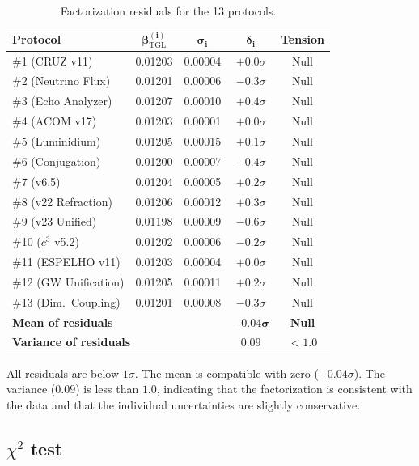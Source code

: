 \documentclass[12pt,a4paper,twoside]{article}
\newcommand{\betatgl}{\beta_{\!\scriptscriptstyle\mathrm{TGL}}}
\begin{document}
\begin{table}[H]
\centering
\caption{Factorization residuals for the 13 protocols.}
\label{tab:residuos}
\begin{tabular}{lcccc}
\toprule
\textbf{Protocol} & $\boldsymbol{\betatgl^{(i)}}$ & $\boldsymbol{\sigma_i}$ & $\boldsymbol{\delta_i}$ & \textbf{Tension} \\
\midrule
\#1 (CRUZ v11) & 0.01203 & 0.00004 & $+0.0\sigma$ & Null \\
\#2 (Neutrino Flux) & 0.01201 & 0.00006 & $-0.3\sigma$ & Null \\
\#3 (Echo Analyzer) & 0.01207 & 0.00010 & $+0.4\sigma$ & Null \\
\#4 (ACOM v17) & 0.01203 & 0.00001 & $+0.0\sigma$ & Null \\
\#5 (Luminidium) & 0.01205 & 0.00015 & $+0.1\sigma$ & Null \\
\#6 (Conjugation) & 0.01200 & 0.00007 & $-0.4\sigma$ & Null \\
\#7 (v6.5) & 0.01204 & 0.00005 & $+0.2\sigma$ & Null \\
\#8 (v22 Refraction) & 0.01206 & 0.00012 & $+0.3\sigma$ & Null \\
\#9 (v23 Unified) & 0.01198 & 0.00009 & $-0.6\sigma$ & Null \\
\#10 ($c^3$ v5.2) & 0.01202 & 0.00006 & $-0.2\sigma$ & Null \\
\#11 (ESPELHO v11) & 0.01203 & 0.00004 & $+0.0\sigma$ & Null \\
\#12 (GW Unification) & 0.01205 & 0.00011 & $+0.2\sigma$ & Null \\
\#13 (Dim.\ Coupling) & 0.01201 & 0.00008 & $-0.3\sigma$ & Null \\
\midrule
\multicolumn{2}{l}{\textbf{Mean of residuals}} & & $\boldsymbol{-0.04\sigma}$ & \textbf{Null} \\
\multicolumn{2}{l}{\textbf{Variance of residuals}} & & $\boldsymbol{0.09}$ & $\boldsymbol{< 1.0}$ \\
\bottomrule
\end{tabular}
\end{table}

All residuals are below $1\sigma$. The mean is compatible with zero ($-0.04\sigma$). The variance ($0.09$) is less than $1.0$, indicating that the factorization is consistent with the data and that the individual uncertainties are slightly conservative.

\subsection{$\chi^2$ test}
\end{document}

